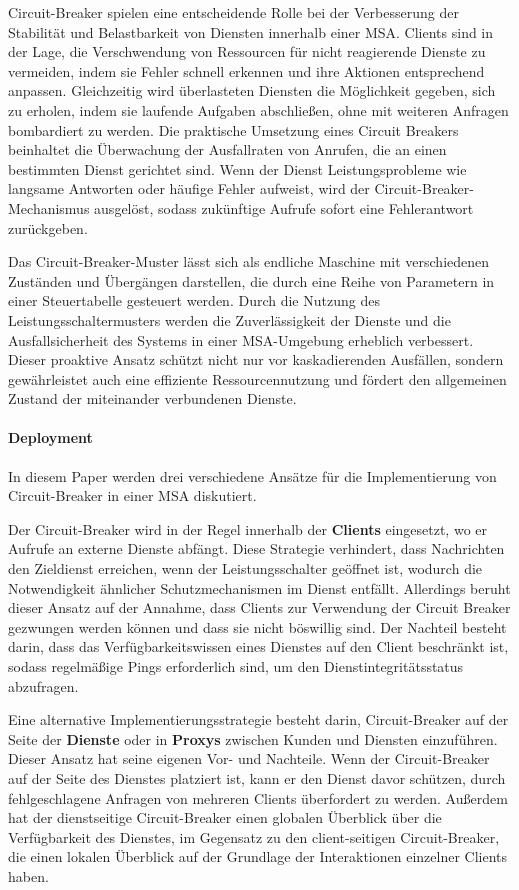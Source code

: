 Circuit-Breaker spielen eine entscheidende Rolle bei der Verbesserung der Stabilität und
Belastbarkeit von Diensten innerhalb einer MSA\@.
Clients sind in der Lage, die Verschwendung von Ressourcen für nicht reagierende Dienste zu vermeiden,
indem sie Fehler schnell erkennen und ihre Aktionen entsprechend anpassen.
Gleichzeitig wird überlasteten Diensten die Möglichkeit gegeben, sich zu erholen,
indem sie laufende Aufgaben abschließen, ohne mit weiteren Anfragen bombardiert zu werden.
Die praktische Umsetzung eines Circuit Breakers beinhaltet die Überwachung der Ausfallraten von Anrufen,
die an einen bestimmten Dienst gerichtet sind.
Wenn der Dienst Leistungsprobleme wie langsame Antworten oder häufige Fehler aufweist,
wird der Circuit-Breaker-Mechanismus ausgelöst,
sodass zukünftige Aufrufe sofort eine Fehlerantwort zurückgeben.

Das Circuit-Breaker-Muster lässt sich als endliche Maschine mit verschiedenen Zuständen
und Übergängen darstellen, die durch eine Reihe von Parametern in einer Steuertabelle gesteuert werden.
Durch die Nutzung des Leistungsschaltermusters werden die Zuverlässigkeit der Dienste und die
Ausfallsicherheit des Systems in einer MSA-Umgebung erheblich verbessert.
Dieser proaktive Ansatz schützt nicht nur vor kaskadierenden Ausfällen,
sondern gewährleistet auch eine effiziente Ressourcennutzung und fördert den allgemeinen Zustand
der miteinander verbundenen Dienste.


\paragraph{Deployment}

In diesem Paper werden drei verschiedene Ansätze für die Implementierung von Circuit-Breaker
in einer MSA diskutiert.

Der Circuit-Breaker wird in der Regel innerhalb der \textbf{Clients} eingesetzt,
wo er Aufrufe an externe Dienste abfängt.
Diese Strategie verhindert, dass Nachrichten den Zieldienst erreichen, wenn der
Leistungsschalter geöffnet ist, wodurch die Notwendigkeit ähnlicher
Schutzmechanismen im Dienst entfällt.
Allerdings beruht dieser Ansatz auf der Annahme, dass Clients zur Verwendung der Circuit Breaker
gezwungen werden können und dass sie nicht böswillig sind.
Der Nachteil besteht darin, dass das Verfügbarkeitswissen eines Dienstes auf den Client beschränkt ist,
sodass regelmäßige Pings erforderlich sind, um den Dienstintegritätsstatus abzufragen.

Eine alternative Implementierungsstrategie besteht darin,
Circuit-Breaker auf der Seite der \textbf{Dienste} oder in \textbf{Proxys} zwischen Kunden und Diensten einzuführen.
Dieser Ansatz hat seine eigenen Vor- und Nachteile.
Wenn der Circuit-Breaker auf der Seite des Dienstes platziert ist,
kann er den Dienst davor schützen, durch fehlgeschlagene Anfragen von mehreren Clients überfordert zu werden.
Außerdem hat der dienstseitige Circuit-Breaker einen globalen Überblick über die Verfügbarkeit des Dienstes,
im Gegensatz zu den client-seitigen Circuit-Breaker, die einen lokalen Überblick
auf der Grundlage der Interaktionen einzelner Clients haben.

